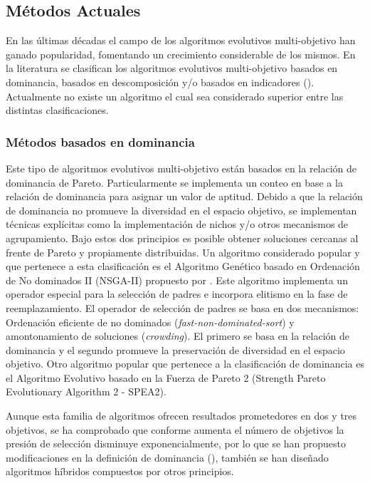 \subsection{Métodos Actuales}
En las últimas décadas el campo de los algoritmos evolutivos multi-objetivo han ganado popularidad, fomentando un crecimiento considerable de los mismos.  
%
En la literatura se  clasifican los algoritmos evolutivos multi-objetivo basados en dominancia, basados en descomposición y/o basados en indicadores (\cite{Joel:ShortSurveyStateArt}). 
%
Actualmente no existe un algoritmo el cual sea considerado superior entre las distintas clasificaciones.
%
\subsubsection{Métodos basados en dominancia}
Este tipo de algoritmos evolutivos multi-objetivo están basados en la relación de dominancia de Pareto.%
%
Particularmente se implementa un conteo en base a la relación de dominancia para asignar un valor de aptitud.
%
Debido a que la relación de dominancia no promueve la diversidad en el espacio objetivo, se implementan técnicas explícitas como la implementación de nichos y/o otros mecanismos de agrupamiento.
%
Bajo estos dos principios es posible obtener soluciones cercanas al frente de Pareto y propiamente distribuidas.
%
Un algoritmo considerado popular y que pertenece a esta clasificación es el Algoritmo Genético basado en Ordenación de No dominados II (NSGA-II) propuesto por \cite{Joel:NSGAII}. Este algoritmo implementa un operador especial para la selección de padres e incorpora elitismo en la fase de reemplazamiento. 
%
El operador de selección de padres se basa en dos mecanismos: Ordenación eficiente de no dominados (\textit{fast-non-dominated-sort}) y amontonamiento de soluciones (\textit{crowding}).
%
El primero se basa en la relación de dominancia y el segundo promueve la preservación de diversidad en el espacio objetivo.
%
Otro algoritmo popular que pertenece a la clasificación de dominancia es el Algoritmo Evolutivo basado en la Fuerza de Pareto 2 (Strength Pareto Evolutionary Algorithm 2 - SPEA2).
%

Aunque esta familia de algoritmos ofrecen resultados prometedores en dos y tres objetivos, se ha comprobado que conforme aumenta el número de objetivos la presión de selección disminuye exponencialmente, por lo que se han propuesto modificaciones en la definición de dominancia (\cite{Joel:Dominancia-ManyObjective, Joel:NSGAIII}), también se han diseñado algoritmos híbridos compuestos por otros principios.

